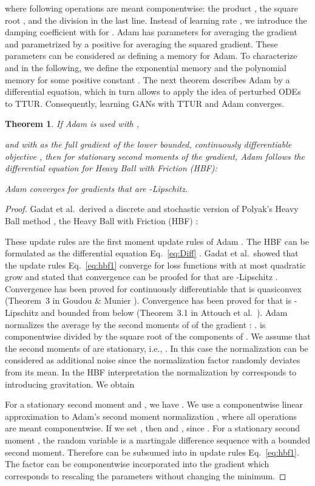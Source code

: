 \documentclass{article}
\newtheorem{theorem}{Theorem}
\begin{document}
where following operations are meant componentwise:
the product ,
the square root , and
the division  in the last line.
Instead of learning rate , we introduce the damping
coefficient  with  for .
Adam has parameters  for averaging the
gradient and  parametrized by a positive  for
averaging the squared gradient.
These parameters can be considered as defining a memory for Adam.
To characterize  and  in the following, we define
the exponential memory   and
the polynomial memory  for some positive
constant . The next theorem describes Adam by a differential
equation, which in turn allows to apply the idea of
 perturbed ODEs to TTUR.
Consequently, learning GANs with TTUR and
Adam converges.
\begin{theorem}
\label{th:adam}
If Adam is used with ,

and with  as the full gradient of the lower bounded,
continuously differentiable objective ,
then for stationary second moments of the gradient,
Adam follows the differential equation
for Heavy Ball with Friction (HBF):

Adam converges for gradients  that are -Lipschitz.
\end{theorem}
\begin{proof}
Gadat et al.\ derived a discrete and stochastic
version of Polyak's Heavy Ball method \cite{Polyak:64},
the Heavy Ball with Friction (HBF) \cite{Gadat:16}:

These update rules are the first moment update rules
of Adam \cite{Kingma:14}.
The HBF can be formulated as the differential equation
Eq.~\eqref{eq:Diff} \cite{Gadat:16}.
Gadat et al.\ showed that the update rules
Eq.~\eqref{eq:hbf1} converge
for loss functions  with at most quadratic grow and
stated that convergence can be proofed
for  that are -Lipschitz \cite{Gadat:16}.
Convergence has been proved for continuously differentiable  that
is quasiconvex (Theorem~3 in Goudou \& Munier \cite{Goudou:09}).
Convergence has been proved for  that is -Lipschitz and
bounded from below (Theorem~3.1 in Attouch et al.\ \cite{Attouch:00}).
Adam normalizes the average  by the second moments  of
of the gradient : .
 is componentwise divided by the square root of
the components of .
We assume that the second moments of  are stationary,
i.e., .
In this case the normalization can be considered as additional noise
since the normalization factor randomly deviates from its mean.
In the HBF interpretation the normalization by 
corresponds to introducing gravitation.
We obtain

For a stationary second moment  and , we have
.
We use a componentwise
linear approximation to Adam's second moment normalization
, where all operations are meant componentwise.
If we set , then  and
, since .
For a stationary second moment , the random variable  is a martingale
difference sequence with a bounded second moment.
Therefore  can be subsumed into   in update
rules Eq.~\eqref{eq:hbf1}. The factor  can be componentwise
incorporated into the gradient  which corresponds to rescaling
the parameters without changing the minimum.
\end{proof}
\end{document}
